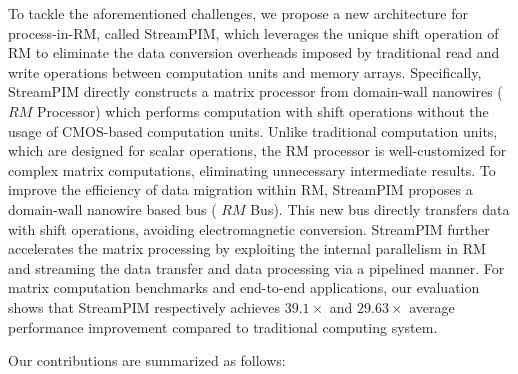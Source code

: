 \documentclass[10pt]{article}
\begin{document}
To tackle the aforementioned challenges, we propose a new architecture for process-in-RM, called StreamPIM, which leverages the unique shift operation of RM to eliminate the data conversion overheads imposed by traditional read and write operations between computation units and memory arrays. Specifically, StreamPIM directly constructs a matrix processor from domain-wall nanowires ( $R M$ Processor) which performs computation with shift operations without the usage of CMOS-based computation units. Unlike traditional computation units, which are designed for scalar operations, the RM processor is well-customized for complex matrix computations, eliminating unnecessary intermediate results. To improve the efficiency of data migration within RM, StreamPIM proposes a domain-wall nanowire based bus ( $R M$ Bus). This new bus directly transfers data with shift operations, avoiding electromagnetic conversion. StreamPIM further accelerates the matrix processing by exploiting the internal parallelism in RM and streaming the data transfer and data processing via a pipelined manner. For matrix computation benchmarks and end-to-end applications, our evaluation shows that StreamPIM respectively achieves $39.1 \times$ and $29.63 \times$ average performance improvement compared to traditional computing system.

Our contributions are summarized as follows:
\end{document}
